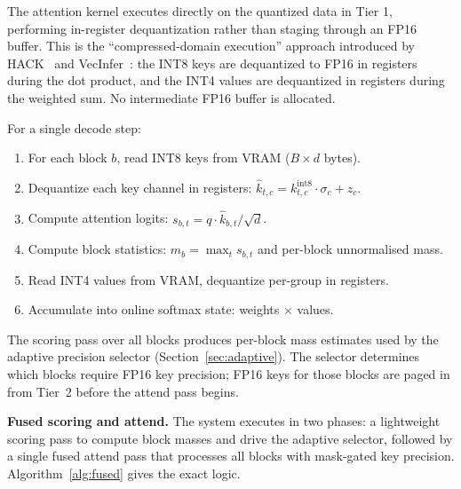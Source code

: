 \documentclass[10pt,twocolumn,a4paper]{article}
\theoremstyle{definition}
\theoremstyle{remark}
\begin{document}
The attention kernel executes directly on the quantized data in Tier 1, performing in-register dequantization rather than staging through an FP16 buffer.  This is the ``compressed-domain execution'' approach introduced by HACK~\cite{hack} and VecInfer~\cite{vecinfer}: the INT8 keys are dequantized to FP16 in registers during the dot product, and the INT4 values are dequantized in registers during the weighted sum.  No intermediate FP16 buffer is allocated.

For a single decode step:
\begin{enumerate}[leftmargin=2em,itemsep=2pt]
  \item For each block $b$, read INT8 keys from VRAM ($B \times d$ bytes).
  \item Dequantize each key channel in registers: $\hat{k}_{t,c} = k_{t,c}^{\mathrm{int8}} \cdot \sigma_c + z_c$.
  \item Compute attention logits: $s_{b,t} = q \cdot \hat{k}_{b,t} / \sqrt{d}$.
  \item Compute block statistics: $m_b = \max_t s_{b,t}$ and per-block unnormalised mass.
  \item Read INT4 values from VRAM, dequantize per-group in registers.
  \item Accumulate into online softmax state: weights $\times$ values.
\end{enumerate}

The scoring pass over all blocks produces per-block mass estimates used by the adaptive precision selector (Section~\ref{sec:adaptive}).  The selector determines which blocks require FP16 key precision; FP16 keys for those blocks are paged in from Tier~2 before the attend pass begins.

\textbf{Fused scoring and attend.}  The system executes in two phases: a lightweight scoring pass to compute block masses and drive the adaptive selector, followed by a single fused attend pass that processes all blocks with mask-gated key precision.  Algorithm~\ref{alg:fused} gives the exact logic.
\end{document}
